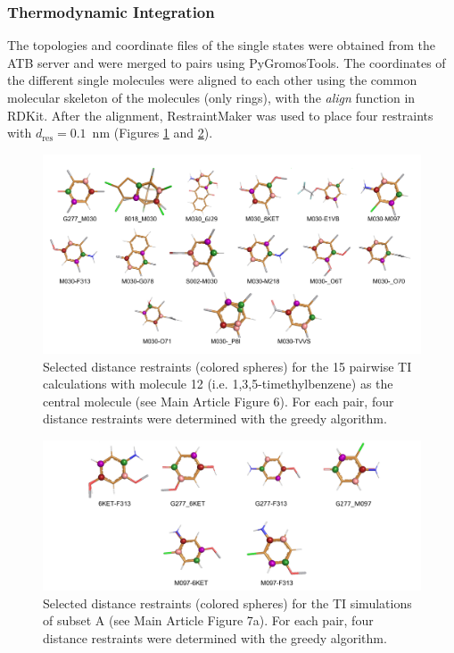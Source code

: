\subsubsection{Thermodynamic Integration}
The topologies and coordinate files of the single states were obtained from the ATB server\cite{Stroet2018} and were merged to pairs using PyGromosTools\cite{Lehner2021}. 
The coordinates of the different single molecules were aligned to each other using the common molecular skeleton of the molecules (only rings), with the \textit{align} function in RDKit\cite{Landrum2021}. After the alignment, RestraintMaker was used to place four restraints with $d_\text{res} = 0.1$~nm (Figures \ref{SIfig: Pairwise_TI_M030_Graph} and \ref{SIfig:Pairwise_TI_AddRE-EDS_Graph}). 

\begin{figure}[H]
    \centering
    \includegraphics[width=\textwidth]{fig/results/pairwise/restraintPlacement/Restraints_PairwiseTI_M030Graph.png}
    \caption{Selected distance restraints (colored spheres) for the 15 pairwise TI calculations with molecule 12 (i.e. 1,3,5-timethylbenzene) as the central molecule (see Main Article Figure 6). For each pair, four distance restraints were determined with the greedy algorithm.}
    \label{SIfig: Pairwise_TI_M030_Graph}
\end{figure}

\begin{figure}[H]
    \centering
    \includegraphics[width=\textwidth]{fig/results/pairwise/restraintPlacement/Restraints_PairwiseTI_reedsaddition.png}
    \caption{Selected distance restraints (colored spheres) for the TI simulations of subset A (see Main Article Figure 7a). For each pair, four distance restraints were determined with the greedy algorithm.}
    \label{SIfig:Pairwise_TI_AddRE-EDS_Graph}
\end{figure}

